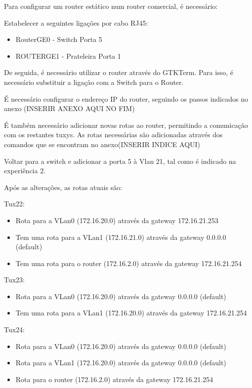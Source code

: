 \documentclass[11pt]{article}
\begin{document}
Para configurar um router estático num router comercial, é necessário:

Estabelecer a seguintes ligações por cabo RJ45:
\begin{itemize}
\item RouterGE0 - Switch Porta 5
\item ROUTERGE1 - Prateleira Porta 1  
\end{itemize}

De seguida, é necessário utilizar o router através do GTKTerm. Para isso, é necessário substituir a ligação com a Switch para o Router.

É necessário configurar o endereço IP do router, seguindo os passos indicados no anexo (INSERIR ANEXO AQUI NO FIM)

É também necessário adicionar novas rotas ao router, permitindo a comunicação com os restantes tuxys. As rotas necessárias são adicionadas através dos comandos que se encontram no anexo(INSERIR INDICE AQUI)

Voltar para a switch e adicionar a porta 5 à Vlan 21, tal como é indicado na experiência 2.

Após as alterações, as rotas atuais são:

Tux22:
\begin{itemize}
\item Rota para a VLan0 (172.16.20.0) através da gateway 172.16.21.253
\item Tem uma rota para a VLan1 (172.16.21.0) através da gateway 0.0.0.0 (default)
\item Tem uma rota para o router (172.16.2.0) através da gateway 172.16.21.254
\end{itemize}

Tux23:
\begin{itemize}
\item Rota para a VLan0 (172.16.20.0) através da gateway 0.0.0.0 (default)
\item Tem uma rota para a VLan1 (172.16.20.0) através da gateway 172.16.21.254
\end{itemize}

Tux24:
\begin{itemize}
\item Rota para a VLan0 (172.16.20.0) através da gateway 0.0.0.0 (default)
\item Rota para a VLan1 (172.16.20.0) através da gateway 0.0.0.0 (default)
\item Rota para o router (172.16.2.0) através da gateway 172.16.21.254
\end{itemize}
\end{document}

